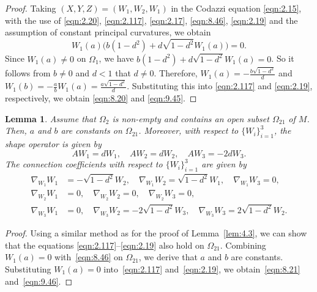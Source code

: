 \documentclass[reqno]{amsart}%
\newtheorem{lemma}[theorem]{Lemma}
\theoremstyle{definition}
\numberwithin{equation}{section}
\begin{document}
\begin{proof}
		Taking $(X,Y,Z)=(W_1,W_2,W_1)$ in the Codazzi equation \eqref{eqn:2.15},
		with the use of \eqref{eqn:2.20}, \eqref{eqn:2.117}, \eqref{eqn:2.17},
		\eqref{eqn:8.46}, \eqref{eqn:2.19} and
		the assumption of constant principal curvatures, we obtain
		$$
		W_1(a)\Big(b(1-d^2)+d\sqrt{1-d^2}W_1(a)\Big)=0.
		$$
		Since $W_1(a)\neq0$ on $\Omega_1$, we have $b(1-d^2)+d\sqrt{1-d^2}W_1(a)=0$.
		So it follows from $b\neq0$ and $d<1$ that $d\neq0$. Therefore,
		$W_1(a)=-\tfrac{b\sqrt{1-d^2}}{d}$ and $W_1(b)=-\tfrac{a}{b}W_1(a)=\tfrac{a\sqrt{1-d^2}}{d}$.
		Substituting this into \eqref{eqn:2.117} and \eqref{eqn:2.19}, respectively,
		we obtain \eqref{eqn:8.20} and \eqref{eqn:9.45}.
	\end{proof}
	
	\begin{lemma}\label{lem:4.45}
		Assume that $\Omega_2$ is non-empty and contains an open subset $\Omega_{21}$ of $M$.
		Then,
		$a$ and $b$ are constants on $\Omega_{21}$.
		Moreover, with respect to $\{W_i\}_{i=1}^3$,
		the shape operator is given by
		\begin{equation}\label{eqn:8.21}
			AW_1=dW_1, \quad AW_2=dW_2, \quad AW_3=-2dW_3.
		\end{equation}
		The connection coefficients with respect to $\{W_i\}_{i=1}^3$ are given by
		\begin{equation}\label{eqn:9.46}
			\begin{aligned}
				\nabla_{W_1}W_1&=-\sqrt{1-d^2}W_2, \quad \nabla_{W_1}W_2=\sqrt{1-d^2}W_1, \quad \nabla_{W_1}W_3=0,\\
				\nabla_{W_2}W_1&=0, \quad \nabla_{W_2}W_2=0, \quad \nabla_{W_2}W_3=0,\\
				\nabla_{W_3}W_1&=0, \quad \nabla_{W_3}W_2=-2\sqrt{1-d^2}W_3, \quad \nabla_{W_3}W_3=2\sqrt{1-d^2}W_2.
			\end{aligned}
		\end{equation}
	\end{lemma}
	
	\begin{proof}
		Using a similar method as for the proof of Lemma~\ref{lem:4.3},
		we can show that the equations \eqref{eqn:2.117}--\eqref{eqn:2.19} also hold on $\Omega_{21}$.
		Combining $W_1(a)=0$ with~\eqref{eqn:8.46} on $\Omega_{21}$,
		we derive that $a$ and $b$ are constants.
		Substituting $W_1(a)=0$ into~\eqref{eqn:2.117} and~\eqref{eqn:2.19},
		we obtain~\eqref{eqn:8.21} and~\eqref{eqn:9.46}.
	\end{proof}
	
\end{document}

